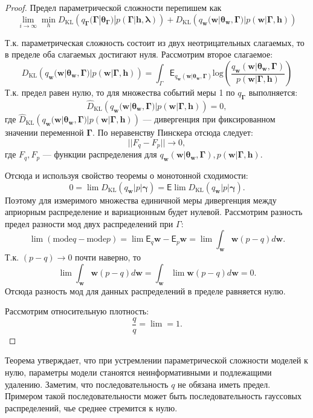 \begin{proof}
Предел параметрической сложности перепишем как 
\[
    \lim_{i \to \infty} \min_{h} D_\text{KL}\left(q_{\boldsymbol{\Gamma}}(\boldsymbol{\Gamma}|\boldsymbol{\theta}_{\boldsymbol{\Gamma}})|p(\boldsymbol{\Gamma}|\mathbf{h}, \boldsymbol{\lambda})\right) + D_\text{KL}\left(q_{\mathbf{w}}(\mathbf{w}|\boldsymbol{\theta}_\mathbf{w},\boldsymbol{\Gamma})|p(\mathbf{w}|\boldsymbol{\Gamma}, \mathbf{h})\right)
\]

Т.к. параметрическая сложность состоит из двух неотрицательных слагаемых, то в пределе оба слагаемых достигают нуля.
Рассмотрим второе слагаемое:
\[
    D_\text{KL}\left(q_{\mathbf{w}}(\mathbf{w}|\boldsymbol{\theta}_\mathbf{w},\boldsymbol{\Gamma})|p(\mathbf{w}|\boldsymbol{\Gamma}, \mathbf{h})\right) = \int_{\Gamma}  \mathsf{E}_{q_{\mathbf{w}}(\mathbf{w}|\boldsymbol{\theta}_\mathbf{w},\boldsymbol{\Gamma})}\text{log}\left(\frac{q_{\mathbf{w}}(\mathbf{w}|\boldsymbol{\theta}_\mathbf{w},\boldsymbol{\Gamma})}{p(\mathbf{w}|\boldsymbol{\Gamma}, \mathbf{h})}\right)
\]
Т.к. предел равен нулю, то для множества событий меры 1 по $q_{\boldsymbol{\Gamma}}$ выполняется:
\[
    \hat{D}_\text{KL}\left(q_{\mathbf{w}}(\mathbf{w}|\boldsymbol{\theta}_\mathbf{w},\boldsymbol{\Gamma})|p(\mathbf{w}|\boldsymbol{\Gamma}, \mathbf{h})\right) = 0,
\] 
где $\hat{D}_\text{KL}\left(q_{\mathbf{w}}(\mathbf{w}|\boldsymbol{\theta}_\mathbf{w},\boldsymbol{\Gamma})|p(\mathbf{w}|\boldsymbol{\Gamma}, \mathbf{h})\right)$ --- дивергенция при фиксированном значении переменной $\boldsymbol{\Gamma}$. По неравенству Пинскера отсюда следует:
\[
    ||F_q - F_p|| \to 0,
\]
где $F_q, F_p$ --- функции распределения для $q_{\mathbf{w}}(\mathbf{w}|\boldsymbol{\theta}_\mathbf{w},\boldsymbol{\Gamma}), p(\mathbf{w}|\boldsymbol{\Gamma}, \mathbf{h})$.

Отсюда и используя свойство теоремы о монотонной сходимости:
\[
    0 = \lim D_\text{KL}(q_\mathbf{w}|p|\boldsymbol{\gamma}) = \mathsf{E} \lim D_\text{KL}(q_\mathbf{w}|p|\boldsymbol{\gamma}).
\]
Поэтому для измеримого множества единичной меры дивергенция между априорным распределение и вариационным будет нулевой.
Рассмотрим разность предел разности мод двух распределений при $\Gamma$:
\[
    \lim (\text{mode} q -  \text{mode} p) = \lim \mathsf{E}_q \mathbf{w} - \mathsf{E}_p \mathbf{w} = \lim \int_\mathbf{w} \mathbf{w} (p-q) d\mathbf{w}.
\]
Т.к. $(p-q) \to 0$ почти наверно, то  %
\[
    \lim \int_\mathbf{w} \mathbf{w} (p-q) d\mathbf{w} =  \int_\mathbf{w} \lim \mathbf{w} (p-q) d\mathbf{w} = 0.
\]
Отсюда разность мод для данных распределений в пределе равняется нулю.

Рассмотрим относительную плотность:
\[
    \frac{q}{q} = \lim = 1.
\]

\end{proof}
Теорема утверждает, что при устремлении параметрической сложности моделей к нулю, параметры модели станоятся неинформативными и подлежащими удалению. Заметим, что последовательность $q$ не обязана иметь предел. Примером такой последовательности может быть последовательность гауссовых распределений, чье среднее стремится к нулю.

